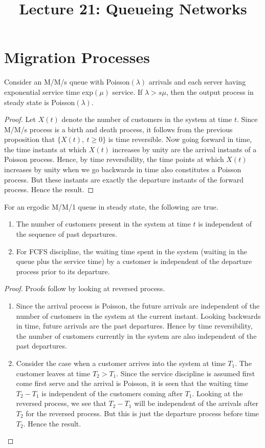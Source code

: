 \documentclass[a4paper,10pt,english]{article}
\title{Lecture 21: Queueing Networks}
\author{}
\begin{document}
\maketitle

\section{Migration Processes}

\begin{cor}
Consider an M/M/s queue with Poisson$(\lambda)$ arrivals and each server having exponential service time exp$(\mu)$ service. If $\lambda > s \mu$, then the output process in steady state is Poisson$(\lambda)$.
\end{cor}
\begin{proof}
Let $X(t)$ denote the number of customers in the system at time $t$. Since M/M/s process is a birth and death process, it follows from the previous proposition that $\{X(t),~t \geq 0\}$ is time reversible. 
Now going forward in time, the time instants at which $X(t)$ increases by unity are the arrival instants of a Poisson process. 
Hence, by time reversibility, the time points at which $X(t)$ increases by unity when we go backwards in time also constitutes a Poisson process. 
But these instants are exactly the departure instants of the forward process. 
Hence the result.
\end{proof}
\begin{lem}
For an ergodic M/M/1 queue in steady state, the following are true.
\begin{enumerate}
\item The number of customers present in the system at time $t$ is independent of the sequence of past departures.
\item For FCFS discipline, the waiting time spent in the system (waiting in the queue plus the service time) by a customer is independent of the departure process prior to its departure.
\end{enumerate} 
\end{lem} 
\begin{proof}
Proofs follow by looking at reversed process.
\begin{enumerate}
\item Since the arrival process is Poisson, the future arrivals are independent of the number of customers in the system at the current instant. Looking backwards in time, future arrivals are the past departures. Hence by time reversibility, the number of customers currently in the system are also independent of the past departures.
\item Consider the case when a customer arrives into the system at time $T_1$. The customer leaves at time $T_2>T_1$.  Since the service discipline is assumed first come first serve and the arrival is Poisson, it is seen that the waiting time $T_2-T_1$ is independent of the customers coming after $T_1$. Looking at the reversed process, we see that $T_2-T_1$  will be independent of the arrivals after $T_2$ for the reversed process. But this is just the departure process before time $T_2$. Hence the result.
\end{enumerate}
\end{proof}
\end{document}
